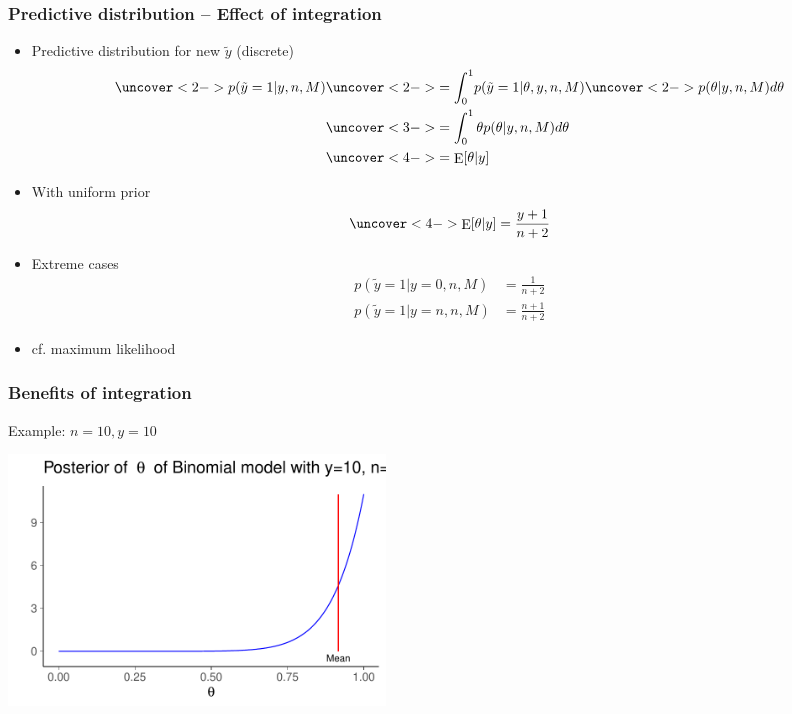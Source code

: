 \documentclass[english,t]{beamer}
\DeclareMathOperator{\E}{E}
\begin{document}
\begin{frame}
  \frametitle{Predictive distribution -- Effect of integration}

  \begin{itemize}
  \item Predictive distribution for new $\tilde{y}$ (discrete)
    \begin{align*}
      \uncover<2->{p(\tilde{y}=1|y,n,M)} & \uncover<2->{= \int_0^1} p(\tilde{y}=1|\theta,y,n,M) \uncover<2->{p(\theta|y,n,M)d\theta}\\
      &\uncover<3->{= \int_0^1 \theta p(\theta|y,n,M)d\theta}\\
      &\uncover<4->{= \E[\theta|y]}
    \end{align*}
    \vskip -4mm
  \item<5-> With uniform prior
    \begin{align*}
      \uncover<4->{\E[\theta|y] = \frac{y+1}{n+2}}
    \end{align*}
  \item<6-> Extreme cases
    \begin{align*}
      p(\tilde{y}=1|y=0,n,M) &= \frac{1}{n+2} \\
      p(\tilde{y}=1|y=n,n,M) &= \frac{n+1}{n+2}
    \end{align*}
    \vskip -2mm

  \item<6-> cf. maximum likelihood

  \end{itemize}
\end{frame}

\begin{frame}
  \frametitle{Benefits of integration}

  Example: $n=10, y=10$
  \begin{center}
  \includegraphics[width=10cm]{dbbeta10.pdf}
  \end{center}

\end{frame}
\end{document}
